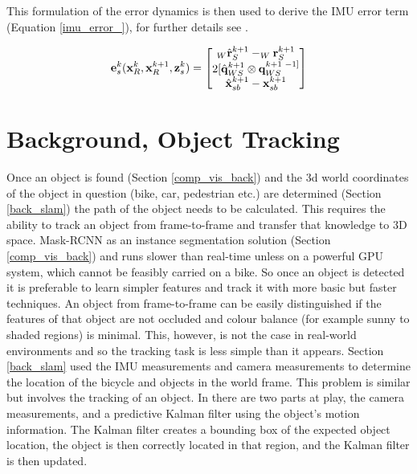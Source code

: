 \documentclass[a4paper,11pt,notitlepage]{article}
\begin{document}
This formulation of the error dynamics is then used to derive the IMU error term (Equation \ref{imu_error_}), for further details see \cite{Okvis_1}.


\begin{equation}
\mathbf{e}^{k}_{s}(\mathbf{x}^{k}_{R},\mathbf{x}^{k+1}_{R},\mathbf{z}_{s}^{k}) = 
\begin{bmatrix}
       _{W} \hat{\mathbf{r}}_{S}^{k+1} - _{W}\mathbf{r}_{S}^{k+1} \\
       
       2[\hat{\mathbf{q}}_{WS}^{k+1} \otimes \mathbf{q}_{WS}^{k+1 \textnormal{ } -1]} \\
       
       \hat{\mathbf{x}}^{k+1}_{sb} - \mathbf{x}_{sb}^{k+1}
\end{bmatrix}
\label{imu_error_}
\end{equation}






\section{Background, Object Tracking}

Once an object is found (Section \ref{comp_vis_back}) and the 3d world coordinates of the object in question (bike, car, pedestrian etc.) are determined (Section \ref{back_slam}) the path of the object needs to be calculated. This requires the ability to track an object from frame-to-frame and transfer that knowledge to 3D space. Mask-RCNN as an instance segmentation solution (Section \ref{comp_vis_back}) and runs slower than real-time unless on a powerful GPU system, which cannot be feasibly carried on a bike. So once an object is detected it is preferable to learn simpler features and track it with more basic but faster techniques. An object from frame-to-frame can be easily distinguished if the features of that object are not occluded and colour balance (for example sunny to shaded regions) is minimal. This, however, is not the case in real-world environments and so the tracking task is less simple than it appears.
\newline \newline
Section \ref{back_slam} used the IMU measurements and camera measurements to determine the location of the bicycle and objects in the world frame. This problem is similar but involves the tracking of an object. In \cite{Ped_tract} there are two parts at play, the camera measurements, and a predictive Kalman filter using the object's motion information. The Kalman filter creates a bounding box of the expected object location, the object is then correctly located in that region, and the Kalman filter is then updated.
\end{document}
